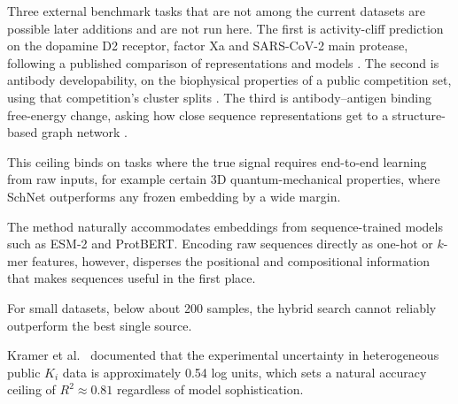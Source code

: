 Three external benchmark tasks that are not among the current datasets are possible later additions and are not run here. The first is activity-cliff prediction on the dopamine D2 receptor, factor Xa and SARS-CoV-2 main protease, following a published comparison of representations and models \citep{Dablander2023}. The second is antibody developability, on the biophysical properties of a public competition set, using that competition's cluster splits \citep{vanNiekerk2026}. The third is antibody--antigen binding free-energy change, asking how close sequence representations get to a structure-based graph network \citep{Hummer2025}.

This ceiling binds on tasks where the true signal requires end-to-end learning from raw inputs, for example certain 3D quantum-mechanical properties, where SchNet outperforms any frozen embedding by a wide margin.

The method naturally accommodates embeddings from sequence-trained models such as ESM-2 and ProtBERT. Encoding raw sequences directly as one-hot or $k$-mer features, however, disperses the positional and compositional information that makes sequences useful in the first place.

For small datasets, below about 200 samples, the hybrid search cannot reliably outperform the best single source.

Kramer et al.\ \citep{Kramer2012} documented that the experimental uncertainty in heterogeneous public $K_i$ data is approximately 0.54 log units, which sets a natural accuracy ceiling of $R^2 \approx 0.81$ regardless of model sophistication.

